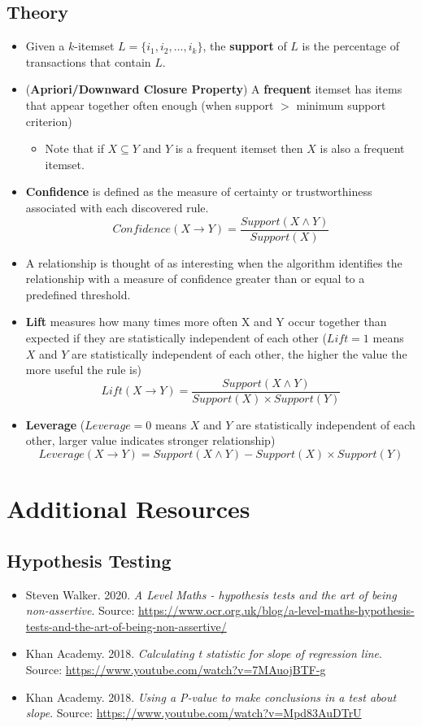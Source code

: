 \documentclass{article}
\begin{document}
\subsection{Theory}
\begin{itemize}
    \item Given a $k$-itemset $L=\{i_1,i_2,\dots,i_k\}$, the \textbf{support} of $L$ is the percentage of transactions that contain $L$.
    \item (\textbf{Apriori/Downward Closure Property}) A \textbf{frequent} itemset has items that appear together often enough (when support $>$ minimum support criterion)
    \begin{itemize}
        \item Note that if $X \subseteq Y$ and $Y$ is a frequent itemset then $X$ is also a frequent itemset.
    \end{itemize}
    \item \textbf{Confidence} is defined as the measure of certainty or trustworthiness associated with each discovered rule.
    $$\textit{Confidence}(X\rightarrow Y) = \frac{\textit{Support}(X\wedge Y)}{\textit{Support}(X)}$$
    \item A relationship is thought of as interesting when the algorithm identifies the relationship with a measure of confidence greater than or equal to a predefined threshold.
    \item \textbf{Lift} measures how many times more often X and Y occur together than expected if they are statistically independent of each other ($Lift=1$ means $X$ and $Y$ are statistically independent of each other, the higher the value the more useful the rule is)
    $$Lift(X \rightarrow Y) = \frac{Support(X \wedge Y)}{Support(X)\times Support(Y)}$$
    \item \textbf{Leverage} ($Leverage =0$ means $X$ and $Y$ are statistically independent of each other, larger value indicates stronger relationship)
    $$Leverage(X \rightarrow Y) = Support(X \wedge Y)-Support(X)\times Support(Y)$$
    
\end{itemize}


\section{Additional Resources}
\subsection{Hypothesis Testing}
\begin{itemize}
    \item Steven Walker. 2020. \textit{A Level Maths - hypothesis tests and the art of being non-assertive}. Source: \url{https://www.ocr.org.uk/blog/a-level-maths-hypothesis-tests-and-the-art-of-being-non-assertive/}
    \item Khan Academy. 2018. \textit{Calculating t statistic for slope of regression line}. Source: \url{https://www.youtube.com/watch?v=7MAuojBTF-g}
    \item Khan Academy. 2018. \textit{Using a P-value to make conclusions in a test about slope}. Source: \url{https://www.youtube.com/watch?v=Mpd83AuDTrU}
\end{itemize}
\end{document}
